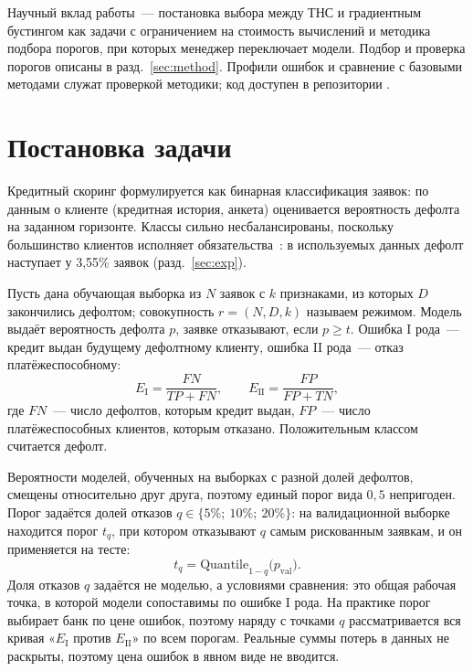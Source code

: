 \documentclass{misisarticle}
\begin{document}
Научный вклад работы~--- постановка выбора между ТНС и градиентным бустингом как задачи с ограничением на стоимость вычислений и методика подбора порогов, при которых менеджер переключает модели. Подбор и проверка порогов описаны в разд.~\ref{sec:method}. Профили ошибок и сравнение с базовыми методами служат проверкой методики; код доступен в репозитории \cite{repo}.


\section{Постановка задачи}
\label{sec:problem}

Кредитный скоринг формулируется как бинарная классификация заявок: по данным о клиенте (кредитная история, анкета) оценивается вероятность дефолта на заданном горизонте. Классы сильно несбалансированы, поскольку большинство клиентов исполняет обязательства~\cite{brown2012}: в используемых данных дефолт наступает у 3,55\% заявок (разд.~\ref{sec:exp}).

Пусть дана обучающая выборка из $N$ заявок с $k$ признаками, из которых $D$ закончились дефолтом; совокупность $r=(N,D,k)$ называем режимом. Модель выдаёт вероятность дефолта $p$, заявке отказывают, если $p\ge t$. Ошибка I рода~--- кредит выдан будущему дефолтному клиенту, ошибка II рода~--- отказ платёжеспособному:
\begin{equation}
E_{\mathrm{I}}=\frac{FN}{TP+FN},\qquad
E_{\mathrm{II}}=\frac{FP}{FP+TN},
\end{equation}
где $FN$~--- число дефолтов, которым кредит выдан, $FP$~--- число платёжеспособных клиентов, которым отказано. Положительным классом считается дефолт.

Вероятности моделей, обученных на выборках с разной долей дефолтов, смещены относительно друг друга, поэтому единый порог вида $0{,}5$ непригоден. Порог задаётся долей отказов $q\in\{5\%;\ 10\%;\ 20\%\}$: на валидационной выборке находится порог $t_q$, при котором отказывают $q$ самым рискованным заявкам, и он применяется на тесте:
\begin{equation}
t_q=\mathrm{Quantile}_{1-q}\bigl(p_{\mathrm{val}}\bigr).
\end{equation}
Доля отказов $q$ задаётся не моделью, а условиями сравнения: это общая рабочая точка, в которой модели сопоставимы по ошибке I рода. На практике порог выбирает банк по цене ошибок, поэтому наряду с точками $q$ рассматривается вся кривая «$E_{\mathrm{I}}$ против $E_{\mathrm{II}}$» по всем порогам. Реальные суммы потерь в данных не раскрыты, поэтому цена ошибок в явном виде не вводится.
\end{document}
